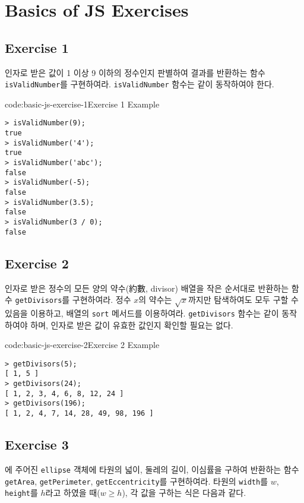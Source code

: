 \section{Basics of JS Exercises} \label{sect:basic-js-exercises}

\subsection*{Exercise 1}
인자로 받은 값이 1 이상 9 이하의 정수인지 판별하여 결과를 반환하는 함수 \texttt{isValidNumber}를 구현하여라. \texttt{isValidNumber} 함수는 \과 같이 동작하여야 한다.

\begin{codeenv}{code:basic-js-exercise-1}{Exercise 1 Example}\begin{verbatim}
> isValidNumber(9);
true
> isValidNumber('4');
true
> isValidNumber('abc');
false
> isValidNumber(-5);
false
> isValidNumber(3.5);
false
> isValidNumber(3 / 0);
false
\end{verbatim}
\end{codeenv}

\subsection*{Exercise 2}
인자로 받은 정수의 모든 양의 약수(約數, divisor) 배열을 작은 순서대로 반환하는 함수 \texttt{getDivisors}를 구현하여라. 정수 $x$의 약수는 $\sqrt{x}$까지만 탐색하여도 모두 구할 수 있음을 이용하고, 배열의 \texttt{sort} 메서드를 이용하여라. \texttt{getDivisors} 함수는 \와 같이 동작하여야 하며, 인자로 받은 값이 유효한 값인지 확인할 필요는 없다.

\begin{codeenv}{code:basic-js-exercise-2}{Exercise 2 Example}\begin{verbatim}
> getDivisors(5);
[ 1, 5 ]
> getDivisors(24);
[ 1, 2, 3, 4, 6, 8, 12, 24 ]
> getDivisors(196);
[ 1, 2, 4, 7, 14, 28, 49, 98, 196 ]
\end{verbatim}
\end{codeenv}
\newpage

\subsection*{Exercise 3}
에 주어진 \texttt{ellipse} 객체에 타원의 넓이, 둘레의 길이, 이심률을 구하여 반환하는 함수 \texttt{getArea}, \texttt{getPerimeter}, \texttt{getEccentricity}를 구현하여라. 타원의 \texttt{width}를 $w$, \texttt{height}를 $h$라고 하였을 때($w \geq h$), 각 값을 구하는 식은 다음과 같다.

